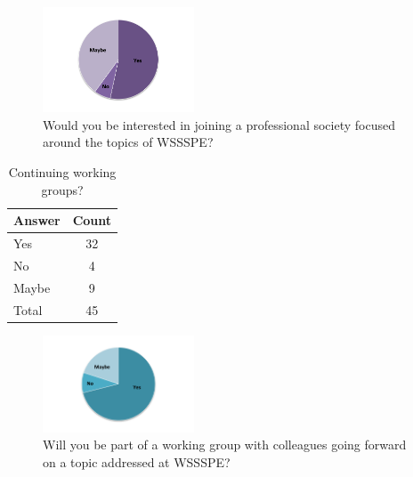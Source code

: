 \begin{figure}[h]
\includegraphics[width=0.4\textwidth]{figures/SurveyFig5rev}
\caption{Would you be interested in joining a professional society focused around the topics of WSSSPE?
\label{fig:SFig5}}
\end{figure}




\begin{table}[h!]
\centering
\caption{Continuing working groups?}
\label{tab:survey_continuing_wgs}
\begin{tabular}{|l|c|}
\hline
{\bf Answer} &
{\bf Count} \\ \hline
Yes &
32 \\
No &
4 \\
Maybe &
9 \\
Total &
45 \\
\hline
\end{tabular}
\end{table}

\begin{figure}[h]
\includegraphics[width=0.4\textwidth]{figures/SurveyFig6rev}
\caption{Will you be part of a working group  with colleagues going forward  on a topic addressed at WSSSPE?
\label{fig:SFig6}}
\end{figure}


